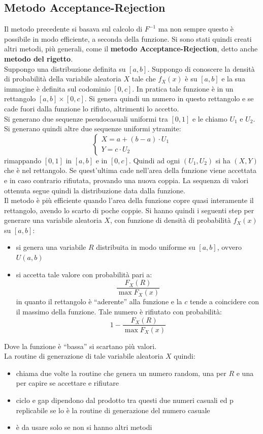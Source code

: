 \message{ !name(modprob.tex)}\documentclass[a4paper,12pt, oneside]{book}
\begin{document}
\subsection{Metodo Acceptance-Rejection}
Il metodo precedente si basava sul calcolo di $F^{-1}$ ma non sempre questo è
possibile in modo efficiente, a seconda della funzione. Si sono stati quindi
creati altri metodi, più generali, come il 
\textbf{metodo Acceptance-Rejection}, detto anche \textbf{metodo del rigetto}.\\
Suppongo una distribuzione definita su $[a,b]$. Suppongo di conoscere la densità
di probabilità della variabile aleatoria $X$ tale che $f_X(x)$ è su $[a,b]$ e la
sua immagine è definita sul codominio $[0,c]$. In pratica tale funzione è in un
rettangolo $[a,b]\times[0,c]$. Si genera quindi un numero in questo rettangolo e
se cade fuori dalla funzione lo rifiuto, altrimenti lo accetto.\\
Si generano due sequenze pseudocasuali uniformi tra $[0,1]$ e le chiamo $U_1$ e
$U_2$. Si generano quindi altre due sequenze uniformi ytramite:
\[
  \begin{cases}
    X=a+(b-a)\cdot U_1\\
    Y=c\cdot U_2
  \end{cases}
\]
rimappando $[0,1]$ in $[a,b]$ e in $[0,c]$. Quindi ad ogni $(U_1,U_2)$ si ha
$(X,Y)$ che è nel rettangolo. Se quest'ultima cade nell'area della funzione
viene accettata e in caso contrario rifiutata, provando una nuova coppia. La
sequenza di valori ottenuta segue quindi la distribuzione data dalla funzione.\\
Il metodo è più efficiente quando l'area della funzione copre quasi interamente
il rettangolo, avendo lo scarto di poche coppie. Si hanno quindi i seguenti
step per generare una variabile aleatoria $X$, con funzione di densità di
probabilità $f_X(x)$ su $[a,b]$:
\begin{itemize}
  \item si genera una variabile $R$ distribuita in modo uniforme su $[a,b]$,
  ovvero $U(a,b)$
  \item si accetta tale valore con probabilità pari a:
  \[\frac{F_X(R)}{\max F_X(x)}\]
  in quanto il rettangolo è ``aderente'' alla funzione e la $c$ tende a
  coincidere con il massimo della funzione. Tale numero è rifiutato con
  probabilità:
  \[1-\frac{F_X(R)}{\max F_X(x)}\]
\end{itemize}
Dove la funzione è ``bassa'' si scartano più valori.\\
La routine di generazione di tale variabile aleatoria $X$ quindi:
\begin{itemize}
  \item chiama due volte la routine che genera un numero random, una per $R$ e
  una per capire se accettare e rifiutare
  \item ciclo e gap dipendono dal prodotto tra questi due numeri casuali ed p
  replicabile se lo è la routine di generazione del numero casuale
  \item è da usare solo se non si hanno altri metodi
\end{itemize}
\end{document}
